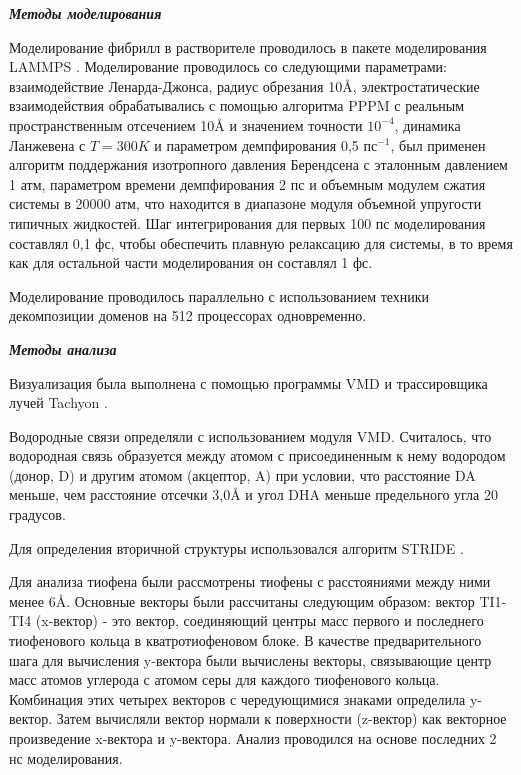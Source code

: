     \emph{\textbf{Методы моделирования}}

    Моделирование фибрилл в растворителе проводилось в пакете моделирования LAMMPS \cite{plimpton_fast_1995}. Моделирование проводилось со следующими параметрами: взаимодействие Ленарда-Джонса, радиус обрезания 10\AA, электростатические взаимодействия обрабатывались с помощью алгоритма PPPM \cite{hockney_computer_1989} с реальным пространственным отсечением 10\AA{} и значением точности $10^{-4}$, динамика Ланжевена с $T=300 K$ и параметром демпфирования 0,5 $пс^{-1}$, был применен алгоритм поддержания изотропного давления Берендсена с эталонным давлением 1 атм, параметром времени демпфирования 2 пс и объемным модулем сжатия системы в 20000 атм, что находится в диапазоне модуля объемной упругости типичных жидкостей. Шаг интегрирования для первых 100 пс моделирования составлял 0,1 фс, чтобы обеспечить плавную релаксацию для системы, в то время как для остальной части моделирования он составлял 1 фс.

    Моделирование проводилось параллельно с использованием техники декомпозиции доменов на 512 процессорах одновременно.

    \emph{\textbf{Методы анализа}}

    Визуализация была выполнена с помощью программы VMD \cite{humphrey_vmd_1996} и трассировщика лучей Tachyon \cite{stone_efficient_1998}.

    Водородные связи определяли с использованием модуля VMD. Считалось, что водородная связь образуется между атомом с присоединенным к нему водородом (донор, D) и другим атомом (акцептор, A) при условии, что расстояние DA меньше, чем расстояние отсечки 3,0\AA{} и угол DHA меньше предельного угла 20 градусов.

    Для определения вторичной структуры использовался алгоритм STRIDE \cite{frishman_knowledge-based_1995}.

    Для анализа тиофена были рассмотрены тиофены с расстояниями между ними менее 6\AA. Основные векторы были рассчитаны следующим образом: вектор TI1-TI4 (x-вектор) - это вектор, соединяющий центры масс первого и последнего тиофенового кольца в кватротиофеновом блоке. В качестве предварительного шага для вычисления y-вектора были вычислены векторы, связывающие центр масс атомов углерода с атомом серы для каждого тиофенового кольца. Комбинация этих четырех векторов с чередующимися знаками определила y-вектор. Затем вычисляли вектор нормали к поверхности (z-вектор) как векторное произведение x-вектора и y-вектора. Анализ проводился на основе последних 2 нс моделирования.


